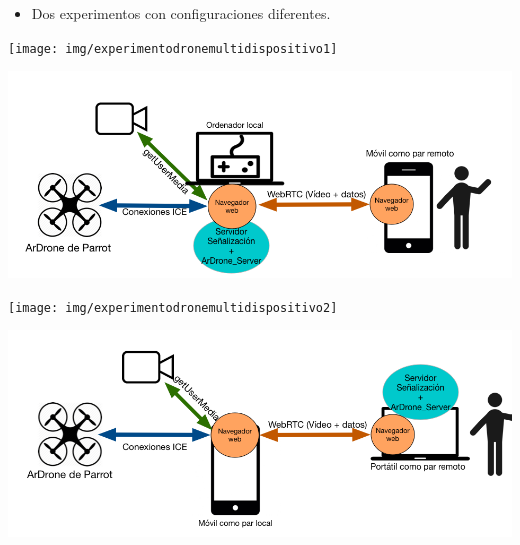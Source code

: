 \documentclass[notes,slidesec,a4]{seminar}
\begin{document}

\begin{hslide}
\begin{itemize}
\item Dos experimentos con configuraciones diferentes.
\end{itemize}
\begin{minipage}[t]{0.4\textwidth}
\texttt{[image: img/experimentodronemultidispositivo1]}
\end{minipage}
\begin{minipage}[t]{0.6\textwidth}
\includegraphics[width=\textwidth]{img/esquema_experimento_multidispositivo_1}
\end{minipage}

\begin{minipage}[t]{0.4\textwidth}
\texttt{[image: img/experimentodronemultidispositivo2]}
\end{minipage}
\begin{minipage}[t]{0.6\textwidth}
\includegraphics[width=\textwidth]{img/experimento_multidispositivo2}
\end{minipage}

\end{hslide}

\end{document}
